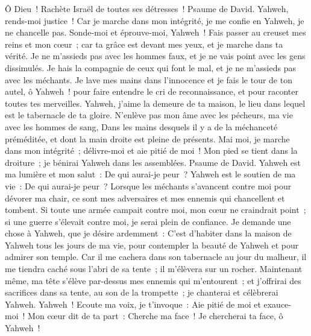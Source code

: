 \begin{multicols}{2}
 Ô Dieu~! Rachète Israël de toutes ses détresses~!
\VerseOne{}Psaume de David. Yahweh, rends-moi justice~! Car je marche dans mon intégrité, je me confie en Yahweh, je ne chancelle pas.
Sonde-moi et éprouve-moi, Yahweh~! Fais passer au creuset mes reins et mon cœur~;
car ta grâce est devant mes yeux, et je marche dans ta vérité.
Je ne m'assieds pas avec les hommes faux, et je ne vais point avec les gens dissimulés.
Je hais la compagnie de ceux qui font le mal, et je ne m'assieds pas avec les méchants.
Je lave mes mains dans l'innocence et je fais le tour de ton autel, ô Yahweh~!
pour faire entendre le cri de reconnaissance, et pour raconter toutes tes merveilles.
Yahweh, j'aime la demeure de ta maison, le lieu dans lequel est le tabernacle de ta gloire.
N'enlève pas mon âme avec les pécheurs, ma vie avec les hommes de sang,
Dans les mains desquels il y a de la méchanceté préméditée, et dont la main droite est pleine de présents.
Mai moi, je marche dans mon intégrité~; délivre-moi et aie pitié de moi~!
Mon pied se tient dans la droiture~; je bénirai Yahweh dans les assemblées.
\VerseOne{}Psaume de David. Yahweh est ma lumière et mon salut~: De qui aurai-je peur~? Yahweh est le soutien de ma vie~: De qui aurai-je peur~?
Lorsque les méchants s'avancent contre moi pour dévorer ma chair, ce sont mes adversaires et mes ennemis qui chancellent et tombent.
Si toute une armée campait contre moi, mon cœur ne craindrait point~; si une guerre s'élevait contre moi, je serai plein de confiance.
Je demande une chose à Yahweh, que je désire ardemment~: C'est d'habiter dans la maison de Yahweh tous les jours de ma vie, pour contempler la beauté de Yahweh et pour admirer son temple.
Car il me cachera dans son tabernacle au jour du malheur, il me tiendra caché sous l'abri de sa tente~; il m'élèvera sur un rocher.
Maintenant même, ma tête s'élève par-dessus mes ennemis qui m'entourent~; et j'offrirai des sacrifices dans sa tente, au son de la trompette~; je chanterai et célèbrerai Yahweh.
Yahweh~! Ecoute ma voix, je t'invoque~: Aie pitié de moi et exauce-moi~!
Mon cœur dit de ta part~: Cherche ma face~! Je chercherai ta face, ô Yahweh~!

\end{multicols}
